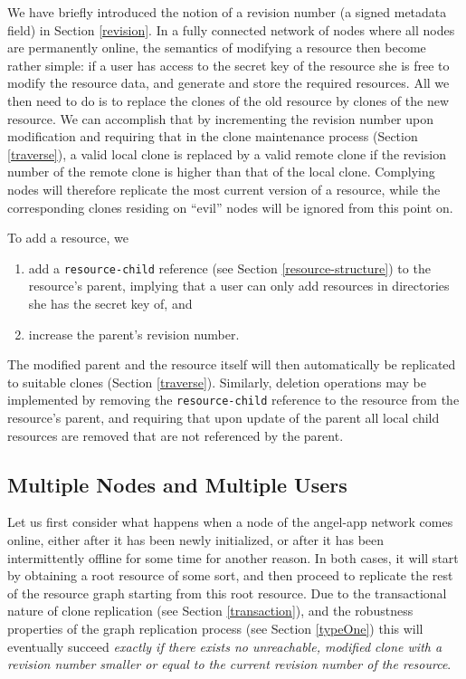 \documentclass[11pt]{article}
\begin{document}
\begin{mainmatter}
We have briefly introduced the notion of a revision number (a signed metadata field) in Section \ref{revision}. In a fully connected network of nodes where all nodes are permanently online, the semantics of modifying a resource then become rather simple: if a user has access to the secret key of the resource she is free to modify the resource data, and generate and store the required resources. All we then need to do is to replace the clones of the old resource by clones of the new resource. We can accomplish that by incrementing the revision number upon modification and requiring that in the clone maintenance process (Section \ref{traverse}), a valid local clone is replaced by a valid remote clone if the revision number of the remote clone is higher than that of the local clone. Complying nodes will therefore replicate the most current version of a resource, while the corresponding clones residing on ``evil'' nodes will be ignored from this point on.

To add a resource, we 
\begin{enumerate}
\item add a  \texttt{resource-child} reference (see Section \ref{resource-structure}) to the resource's parent, implying that a user can only add resources in directories she has the secret key of, and 
\item increase the parent's revision number.
\end{enumerate}
The modified parent and the resource itself will then automatically be replicated to suitable clones (Section \ref{traverse}). Similarly, deletion operations may be implemented by removing the \texttt{resource-child}  reference to the resource from the resource's parent, and requiring that upon update of the parent all local child resources are removed that are not referenced by the parent.

\subsection{Multiple Nodes and Multiple Users}
\label{multiple}
Let us first consider what happens when a node of the angel-app network comes online, either after it has been newly initialized, or after it has been intermittently offline for some time for another reason. In both cases, it will start by obtaining a root resource of some sort, and then proceed to replicate the rest of the resource graph starting from this root resource. Due to the transactional nature of clone replication (see Section \ref{transaction}), and the robustness properties of the graph replication process (see Section \ref{typeOne}) this will eventually succeed \emph{exactly if there exists no unreachable, modified clone  with a revision number smaller or equal to the current revision number of the resource}.


\end{mainmatter}
\end{document}
